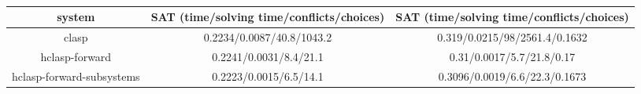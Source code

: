  \begin{table*}[ht]
   \centering
   \begin{tabular}{|c|cc|}
     \hline
system & SAT (time/solving time/conflicts/choices) & SAT (time/solving time/conflicts/choices) \\ \hline     
clasp & 0.2234/0.0087/40.8/1043.2 & 0.319/0.0215/98/2561.4/0.1632 \\ \hline
hclasp-forward & 0.2241/0.0031/8.4/21.1 & 0.31/0.0017/5.7/21.8/0.17 \\ \hline
hclasp-forward-subsystems & 0.2223/0.0015/6.5/14.1 & 0.3096/0.0019/6.6/22.3/0.1673 \\ \hline
   \end{tabular}
   \caption{}
   \label{tab:usa-advisor}
 \end{table*}
